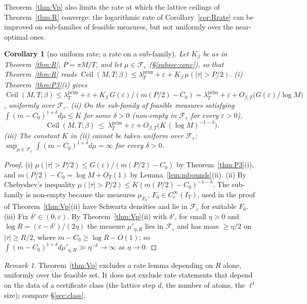 \documentclass[11pt]{amsart}
\newtheorem{corollary}[theorem]{Corollary}
\theoremstyle{definition}
\theoremstyle{remark}
\newtheorem{remark}[theorem]{Remark}
\newcommand{\IT}{I_T}
\newcommand{\lamP}{\lambda^{\mathrm{prim}}_T}
\begin{document}
Theorem~\ref{thm:Vp} also limits the rate at which the lattice ceilings of Theorem~\ref{thm:R} converge: the
logarithmic rate of Corollary~\ref{cor:Rrate} can be improved on sub-families of feasible measures, but not
uniformly over the near-optimal ones.

\begin{corollary}[no uniform rate; a rate on a sub-family]\label{cor:CP}
Let $K_\beta$ be as in Theorem~\ref{thm:R}, $P=\pi M/T$, and let
$\mu\in\mathcal F_\varepsilon$ (\S\ref{subsec:conc}), so that Theorem~\ref{thm:R} reads
$\operatorname{Ceil}(M,T;\beta)\le\lamP+\varepsilon+K_\beta\,\mu(|\tau|>P/2)$.
\emph{(i)} Theorem~\ref{thm:P3}(i) gives
$\operatorname{Ceil}(M,T;\beta)\le\lamP+\varepsilon+K_\beta\,G(\varepsilon)/(m(P/2)-C_0)=\lamP+\varepsilon+O_{\beta,T}\big(G(\varepsilon)/\log M\big)$,
uniformly over $\mathcal F_\varepsilon$.
\emph{(ii)} On the sub-family of feasible measures satisfying $\int(m-C_0)^{1+\delta}d\mu\le K$ for
some $\delta>0$ (non-empty in $\mathcal F_\varepsilon$ for every $\varepsilon>0$),
\[
\operatorname{Ceil}(M,T;\beta)\ \le\ \lamP+\varepsilon+O_{\beta,T}\big(K\,(\log M)^{-1-\delta}\big).
\]
\emph{(iii)} The constant $K$ in (ii) cannot be taken uniform over $\mathcal F_\varepsilon$:
$\sup_{\mu\in\mathcal F_\varepsilon}\int(m-C_0)^{1+\delta}d\mu=\infty$ for every $\delta>0$.
\end{corollary}
\begin{proof}
(i) $\mu(|\tau|>P/2)\le G(\varepsilon)/(m(P/2)-C_0)$ by
Theorem~\ref{thm:P3}(i), and $m(P/2)-C_0=\log M+O_T(1)$ by Lemma~\ref{lem:mbounds}(ii). (ii) By Chebyshev's
inequality $\mu(|\tau|>P/2)\le K(m(P/2)-C_0)^{-1-\delta}$. The sub-family is non-empty because the
measures $\mu_{F_0}$, $F_0\in C_c^\infty(\IT)$, used in the proof of Theorem~\ref{thm:Vp}(ii) have
Schwartz densities and lie in $\mathcal F_\varepsilon$ for suitable $F_0$. (iii) Fix $\delta'\in(0,\varepsilon)$.
By Theorem~\ref{thm:Vp}(ii) with $\delta'$, for small $\eta>0$ and $\log R=(\varepsilon-\delta')/(2\eta)$ the
measure $\mu'_{\eta,R}$ lies in $\mathcal F_\varepsilon$ and has mass $\ge\eta/2$ on $|\tau|\ge R/2$, where
$m-C_0\ge\log R-O(1)$; so $\int(m-C_0)^{1+\delta}d\mu'_{\eta,R}\gg\eta^{-\delta}\to\infty$ as $\eta\to0$.
\end{proof}


\begin{remark}
Theorem~\ref{thm:Vp} excludes a rate lemma depending on $R$ alone, uniformly over the feasible
set. It does not exclude rate statements that depend on the data of a certificate class (the
lattice step $d$, the number of atoms, the $\ell^1$ size); compare \S\ref{sec:class}.
\end{remark}
\end{document}
